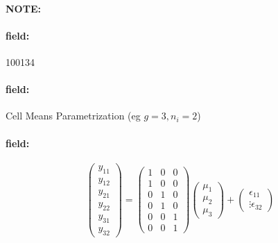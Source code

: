 \documentclass[12pt]{article}
\newenvironment{note}{\paragraph{NOTE:}}{}
\newenvironment{field}{\paragraph{field:}}{}
\begin{document}
\begin{note}
 \begin{field}
  \tiny 100134
 \end{field}
 \begin{field}
  Cell Means Parametrization
  (eg $g = 3, n_i = 2$)
 \end{field}
 \begin{field}
  $$ \begin{pmatrix}
    y_{11} \\ y_{12} \\ y_{21} \\ y_{22} \\ y_{31} \\y_{32}
   \end{pmatrix}  = \begin{pmatrix}
    1 & 0 & 0 \\
    1 & 0 & 0 \\
    0 & 1 & 0 \\
    0 & 1 & 0 \\
    0 & 0 & 1 \\
    0 & 0 & 1
   \end{pmatrix} \begin{pmatrix}
    \mu_{1} \\ \mu_2 \\ \mu_3
   \end{pmatrix} + \begin{pmatrix}
    \epsilon_{11} \\ \vdots \epsilon_{32}
   \end{pmatrix}$$
 \end{field}
\end{note}
\end{document}
